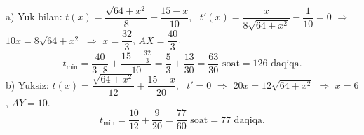 a) Yuk bilan: $t(x)=\dfrac{\sqrt{64+x^2}}8+\dfrac{15-x}{10}$, \ $t'(x)=\dfrac x{8\sqrt{64+x^2}}-\dfrac1{10}=0$ $\Rightarrow$ $10x=8\sqrt{64+x^2}$ $\Rightarrow$ $x=\dfrac{32}3$, $AX=\dfrac{40}3$.
\[t_{\min}=\frac{40}{3\cdot8}+\frac{15-\frac{32}3}{10}=\frac53+\frac{13}{30}=\frac{63}{30}\text{ soat}=126\text{ daqiqa}.\]
b) Yuksiz: $t(x)=\dfrac{\sqrt{64+x^2}}{12}+\dfrac{15-x}{20}$, \ $t'=0$ $\Rightarrow$ $20x=12\sqrt{64+x^2}$ $\Rightarrow$ $x=6$, $AY=10$.
\[t_{\min}=\frac{10}{12}+\frac9{20}=\frac{77}{60}\text{ soat}=77\text{ daqiqa}.\]

\ShowJavoblar

